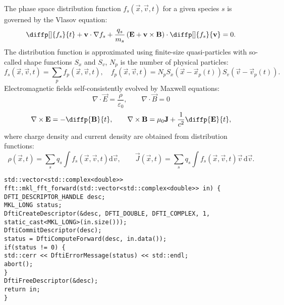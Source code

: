 \newpage
\noindent
The phase space distribution function  $ f_{s} \left(\vec{x}, \vec{v}, t\right) $ for a given species $ s $ is governed by the Vlasov equation:
\begin{equation*}
\diffp[]{f_{s}}{t} + \vec{v} \cdot \nabla f_s + \frac{q_{s}}{m_{s}}\left( \vec{E} + \vec{v} \times \vec{B} \right) \cdot \diffp[]{f_s}{\vec{v}} = 0.
\end{equation*}
The distribution function is approximated using finite-size quasi-particles with so-called shape functions $ S_{x} $ and $ S_{v} $, $ N_p $ is the number of physical particles: 
\begin{equation*}
f_{s} \left(\vec{x}, \vec{v}, t \right) =  \sum_{p} f_{p}\left(\vec{x}, \vec{v}, t \right), \quad f_{p}\left(\vec{x}, \vec{v}, t \right) = N_{p} S_{x}\left(\vec{x} - \vec{x}_{p}\left(t\right) \right)  S_{v}\left(\vec{v} - \vec{v}_{p}\left( t\right) \right).
\end{equation*}
Electromagnetic fields self-consistently evolved by Maxwell equations:
\begin{equation*}
\nabla \cdot \vec{E} = \frac{\rho}{\varepsilon_{0}}, \qquad \nabla \cdot \vec{B} = 0
\end{equation*}
\begin{equation*}
\nabla \times \vec{E} = - \diffp{\vec{B}}{t}, \qquad \nabla \times \vec{B} = \mu_{0} \vec{J} + \frac{1}{c^{2}} \diffp{\vec{E}}{t},
\end{equation*}
where charge density and current density are obtained from distribution functions:
\begin{equation*}
\rho\left(\vec{x}, t \right) = \sum_s q_s \int f_s \left(\vec{x}, \vec{v}, t \right) \mathrm{d} \vec{v}, \qquad \vec{J}\left(\vec{x}, t \right) = \sum_s q_s \int f_s \left(\vec{x}, \vec{v}, t \right) \vec{v} \, \mathrm{d} \vec{v}.
\end{equation*}



\begin{lstlisting}[style=CXX, caption=Function performing forward fast Fourier transform using MKL library]
std::vector<std::complex<double>> fft::mkl_fft_forward(std::vector<std::complex<double>> in) {
DFTI_DESCRIPTOR_HANDLE desc;
MKL_LONG status;
DftiCreateDescriptor(&desc, DFTI_DOUBLE, DFTI_COMPLEX, 1, static_cast<MKL_LONG>(in.size()));
DftiCommitDescriptor(desc);
status = DftiComputeForward(desc, in.data());
if(status != 0) {
std::cerr << DftiErrorMessage(status) << std::endl;
abort();
}
DftiFreeDescriptor(&desc);
return in;
}
\end{lstlisting}

